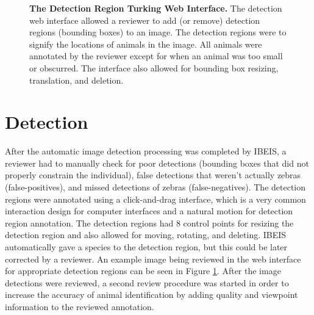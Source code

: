 \begin{figure}[t]%
    \centering
        \caption[The Detection Region Turking Web Interface]{\textbf{The Detection Region Turking Web Interface.}  The detection web interface allowed a reviewer to add (or remove) detection regions (bounding boxes) to an image.  The detection regions were to signify the locations of animals in the image.  All animals were annotated by the reviewer except for when an animal was too small or obscurred.  The interface also allowed for bounding box resizing, translation, and deletion.}
        \label{fig:turking_interface_detection}
\end{figure}

\section{Detection}
After the automatic image detection processing was completed by IBEIS, a reviewer had to manually check for poor detections (bounding boxes that did not properly constrain the individual), false detections that weren't actually zebras (false-positives), and missed detections of zebras (false-negatives).  The detection regions were annotated using a click-and-drag interface, which is a very common interaction design for computer interfaces and a natural motion for detection region annotation.  The detection regions had 8 control points for resizing the detection region and also allowed for moving, rotating, and deleting.  IBEIS automatically gave a species to the detection region, but this could be later corrected by a reviewer.  An example image being reviewed in the web interface for appropriate detection regions can be seen in Figure \ref{fig:turking_interface_detection}.  After the image detections were reviewed, a second review procedure was started in order to increase the accuracy of animal identification by adding quality and viewpoint information to the reviewed annotation.

